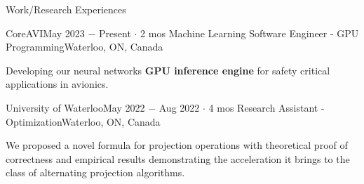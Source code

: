 \documentclass{resume}
\begin{document}
\begin{rSection}{Work/Research Experiences}
    \begin{rSubsection}{CoreAVI}{May 2023 \(-\) Present \(\cdot\) 2 mos}
        {Machine Learning Software Engineer - GPU Programming}{Waterloo, ON, Canada}
        \item Developing our neural networks \textbf{GPU inference engine} for safety critical applications in avionics.
    \end{rSubsection}

    \begin{rSubsection}{University of Waterloo}{May 2022 \(-\) Aug 2022 \(\cdot\) 4 mos}
        {Research Assistant - Optimization}{Waterloo, ON, Canada}
        \item We proposed a novel formula for projection operations with theoretical proof of correctness and empirical results demonstrating the acceleration it brings to the class of alternating projection algorithms.
    \end{rSubsection}

\end{rSection}



\end{document}
